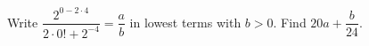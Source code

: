 Write $\dfrac{2^{0-2\cdot4}}{2\cdot0!+2^{-4}} = \dfrac{a}{b}$ in lowest terms with $b>0$. Find $20 a + \dfrac{b}{24}$.
